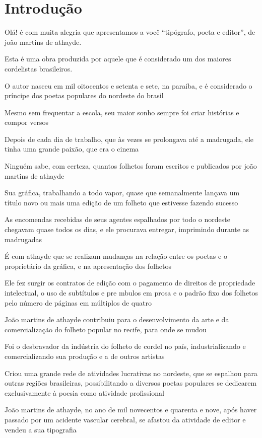 \documentclass[12pt]{extarticle}
\begin{document}
\section{Introdução}

Olá! é com muita alegria que apresentamos a você “tipógrafo, poeta e editor”, de joão martins de athayde.

Esta é uma obra produzida por aquele que é considerado um dos maiores cordelistas brasileiros.

O autor nasceu em mil oitocentos e setenta e sete, na paraíba,  e é considerado  o príncipe dos poetas populares do nordeste do brasil  

Mesmo sem frequentar a escola,  seu maior sonho sempre foi criar histórias e compor versos

Depois de cada dia de trabalho, que às vezes se prolongava até a madrugada, ele tinha uma grande paixão, que era o cinema 

Ninguém sabe, com certeza, quantos folhetos foram escritos e publicados por joão martins de athayde

Sua gráfica, trabalhando a todo vapor, quase que semanalmente lançava um título novo ou mais uma edição de um folheto que estivesse fazendo sucesso

As encomendas recebidas de seus agentes espalhados por todo o nordeste chegavam quase todos os dias, e ele procurava entregar, imprimindo durante as madrugadas

É com athayde que se realizam mudanças na relação entre os poetas e o proprietário da gráfica, e na apresentação dos folhetos

Ele fez surgir os contratos de edição com o pagamento de direitos de propriedade intelectual, o uso de subtítulos e pre mbulos em prosa e o padrão fixo dos folhetos pelo número de páginas em múltiplos de quatro

João martins de athayde contribuiu para o desenvolvimento da arte e da comercialização do folheto popular no recife, para onde se mudou

Foi o desbravador da indústria do folheto de cordel no país, industrializando e comercializando sua produção e a de outros artistas

Criou uma grande rede de atividades lucrativas no nordeste, que se espalhou para outras regiões brasileiras, possibilitando a diversos poetas populares se dedicarem exclusivamente à poesia como atividade profissional

João martins de athayde, no ano de mil novecentos e quarenta e nove, após haver passado por um acidente vascular cerebral, se afastou da atividade de editor e vendeu a sua tipografia 
\end{document}

